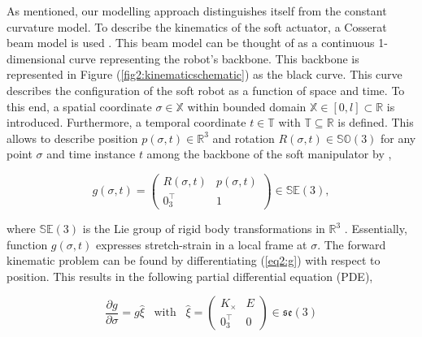 As mentioned, our modelling approach distinguishes itself from the constant curvature model. To describe the kinematics of the soft actuator, a Cosserat beam model is used \cite{Boyer2019}. This beam model can be thought of as a continuous 1-dimensional curve representing the robot's backbone. This backbone is represented in Figure (\ref{fig2:kinematicschematic}) as the black curve. This curve describes the configuration of the soft robot as a function of space and time. To this end, a spatial coordinate  $\sigma \in \mathbb{X}$ within bounded domain $\mathbb{X} \in [0,l] \subset \mathbb{R}$ is introduced. Furthermore, a temporal coordinate $t \in  \mathbb{T}$ with $\mathbb{T} \subseteq \mathbb{R}$ is defined. This allows to describe position $p(\sigma,t) \in \mathbb{R}^3$ and rotation $R(\sigma,t) \in \mathbb{SO}(3)$ for any point $\sigma$ and time instance $t$ among the backbone of the soft manipulator by \cite{Caasenbrood2020},


\begin{equation}
    g(\sigma,t) = \begin{pmatrix}  R(\sigma,t) & p(\sigma,t) \\ 0_3^\top & 1 \end{pmatrix} \in \mathbb{SE}(3),
    \label{eq2:g}
\end{equation}

where $\mathbb{SE}(3)$ is the Lie group of rigid body transformations in $\mathbb{R}^3$ \cite{Sola2018}. Essentially, function $g(\sigma,t)$ expresses stretch-strain in a local frame at $\sigma$. The forward kinematic problem can be found by differentiating (\ref{eq2:g}) with respect to position. This results in the following partial differential equation (PDE), 


\begin{equation}
    \frac{\partial g}{\partial \sigma} = g \hat{\xi} \hspace{10pt} \text{with} \hspace{10pt}  \hat{\xi} = \begin{pmatrix} K_\times & E \\ 0_3^\top & 0 \end{pmatrix} \in  \mathfrak{se}(3)
    \label{eq2:dgdsigma}
\end{equation}

